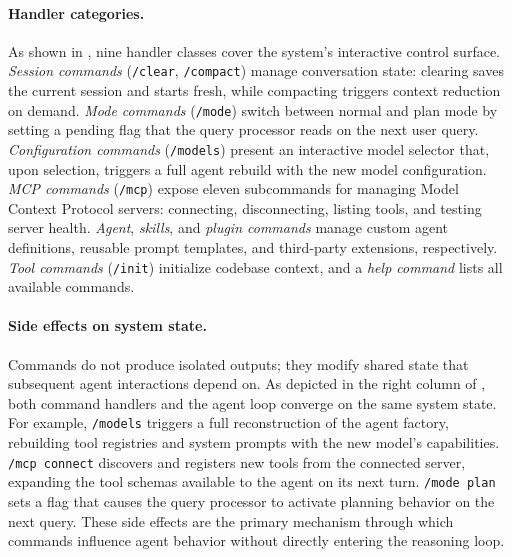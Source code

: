 \paragraph{Handler categories.} As shown in , nine handler classes cover the system's interactive control surface. \emph{Session commands} (\texttt{/clear}, \texttt{/compact}) manage conversation state: clearing saves the current session and starts fresh, while compacting triggers context reduction on demand. \emph{Mode commands} (\texttt{/mode}) switch between normal and plan mode by setting a pending flag that the query processor reads on the next user query. \emph{Configuration commands} (\texttt{/models}) present an interactive model selector that, upon selection, triggers a full agent rebuild with the new model configuration. \emph{MCP commands} (\texttt{/mcp}) expose eleven subcommands for managing Model Context Protocol servers: connecting, disconnecting, listing tools, and testing server health. \emph{Agent}, \emph{skills}, and \emph{plugin commands} manage custom agent definitions, reusable prompt templates, and third-party extensions, respectively. \emph{Tool commands} (\texttt{/init}) initialize codebase context, and a \emph{help command} lists all available commands.

\paragraph{Side effects on system state.} Commands do not produce isolated outputs; they modify shared state that subsequent agent interactions depend on. As depicted in the right column of , both command handlers and the agent loop converge on the same system state. For example, \texttt{/models} triggers a full reconstruction of the agent factory, rebuilding tool registries and system prompts with the new model's capabilities. \texttt{/mcp connect} discovers and registers new tools from the connected server, expanding the tool schemas available to the agent on its next turn. \texttt{/mode plan} sets a flag that causes the query processor to activate planning behavior on the next query. These side effects are the primary mechanism through which commands influence agent behavior without directly entering the reasoning loop.

